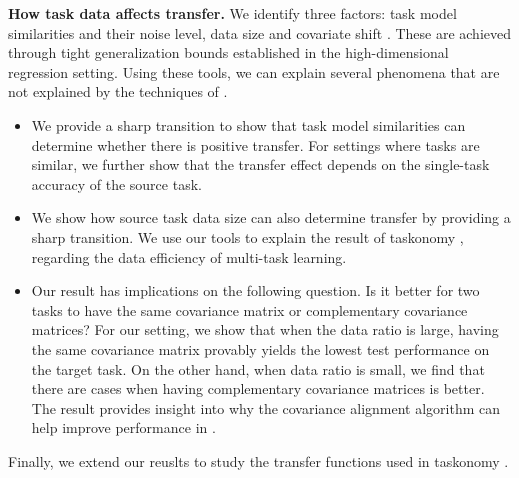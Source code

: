 \textbf{How task data affects transfer.}
	We identify three factors: task model similarities and their noise level, data size and covariate shift \cite{PY09,K18}.
	These are achieved through tight generalization bounds established in the high-dimensional regression setting.
	Using these tools, we can explain several phenomena that are not explained by the techniques of \cite{WZR20}.
	\begin{itemize}
		\item We provide a sharp transition to show that task model similarities can determine whether there is positive transfer.
		For settings where tasks are similar, we further show that the transfer effect depends on the single-task accuracy of the source task.
		\item We show how source task data size can also determine transfer by providing a sharp transition.
		We use our tools to explain the result of taskonomy \cite{ZSSGM18}, regarding the data efficiency of multi-task learning.
		\item Our result has implications on the following question.
	Is it better for two tasks to have the same covariance matrix or complementary covariance matrices?
	For our setting, we show that when the data ratio is large, having the same covariance matrix provably yields the lowest test performance on the target task.
	On the other hand, when data ratio is small, we find that there are cases when having complementary covariance matrices is better.
	The result provides insight into why the covariance alignment algorithm can help improve performance in \cite{WZR20}.
	\end{itemize}

Finally, we extend our reuslts to study the transfer functions used in taskonomy \cite{ZSSGM18}.



